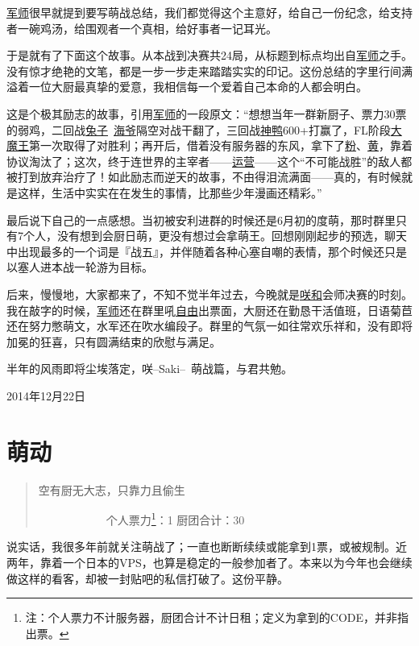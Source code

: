 \uline{军师}很早就提到要写萌战总结，我们都觉得这个主意好，给自己一份纪念，给支持者一碗鸡汤，给围观者一个真相，给好事者一记耳光。

于是就有了下面这个故事。从本战到决赛共24局，从标题到标点均出自\uline{军师}之手。没有惊才绝艳的文笔，都是一步一步走来踏踏实实的印记。这份总结的字里行间满溢着一位大厨最真挚的爱意，我相信每一个爱着自己本命的人都会明白。

这是个极其励志的故事，引用\uline{军师}的一段原文：“想想当年一群新厨子、票力30票的弱鸡，二回战\uline{兔子}~\uline{海爷}隔空对战干翻了，三回战\uline{神鸭}600+打赢了，FL阶段\uline{大魔王}第一次取得了对胜利；再开后，借着没有服务器的东风，拿下了\uline{粉}、\uline{黄}，靠着协议淘汰了；这次，终于连世界的主宰者——\uline{运营}——这个“不可能战胜”的敌人都被打到放弃治疗了！如此励志而逆天的故事，不由得泪流满面——真的，有时候就是这样，生活中实实在在发生的事情，比那些少年漫画还精彩。”

最后说下自己的一点感想。当初被安利进群的时候还是6月初的度萌，那时群里只有7个人，没有想到会厨日萌，更没有想过会拿萌王。回想刚刚起步的预选，聊天中出现最多的一个词是『战五』，并伴随着各种心塞自嘲的表情，那个时候还只是以塞人进本战一轮游为目标。

后来，慢慢地，大家都来了，不知不觉半年过去，今晚就是\uline{咲}\uline{和}会师决赛的时刻。我在敲字的时候，\uline{军师}还在群里吼\uline{自由}出票面，大厨还在勤恳干活值班，日语菊苣还在努力憋萌文，水军还在吹水编段子。群里的气氛一如往常欢乐祥和，没有即将加冕的狂喜，只有圆满结束的欣慰与满足。

半年的风雨即将尘埃落定，咲–Saki–~萌战篇，与君共勉。

\begin{flushright}

2014年12月22日
\end{flushright}

\chapter{萌动}

\begin{quote}
空有厨无大志，只靠力且偷生

　　　　　　个人票力\footnote{注：个人票力不计服务器，厨团合计不计日租；定义为拿到的CODE，并非指出票。}：1 厨团合计：30
\end{quote}

说实话，我很多年前就关注萌战了；一直也断断续续或能拿到1票，或被规制。近两年，靠着一个日本的VPS，也算是稳定的一般参加者了。本来以为今年也会继续做这样的看客，却被一封贴吧的私信打破了。这份平静。

